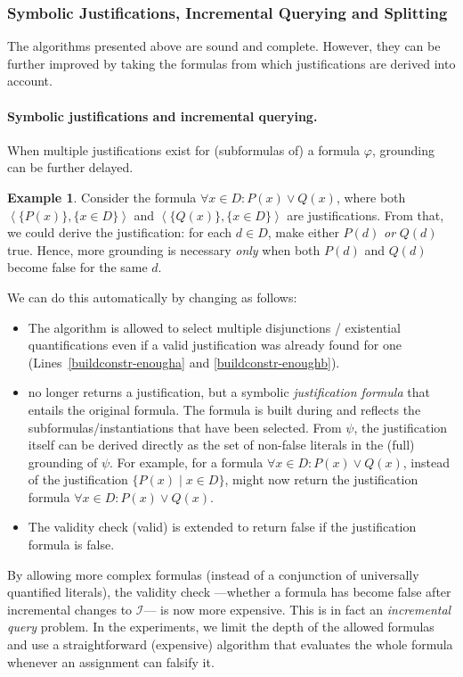 \documentclass[11pt]{article}
\newcommand{\m}[1]{\ensuremath{#1}\xspace}
\newcommand{\I}{\m{\mathcal{I}}}
\newcommand{\f}{\m{\varphi}}
\newcommand{\typed}[2]{\m{#1\in #2:}}
\newcommand{\tuple}[1]{\m{\left \langle #1 \right \rangle }}
\theoremstyle{plain}
\theoremstyle{definition}
\theoremstyle{example_basic}
\newtheorem{example}[thm]{Example}
\theoremstyle{example_contd}
\theoremstyle{plain}
\newcommand{\change}[1]{#1}
\begin{document}
\subsubsection{Symbolic Justifications, Incremental Querying and Splitting}\label{ssec:splitting}
The algorithms presented above are sound and complete. \change{However, they can be further improved by taking the formulas from which
justifications are derived into account.}

\paragraph{Symbolic justifications and incremental querying.}
\change{When multiple justifications exist for (subformulas of) a
  formula \f, grounding can be further delayed.}
\begin{example}
Consider the formula $\forall \typed{x}{D} P(x) \lor Q(x)$, where both
$\tuple{\{P(x)\},\{x\in D\}}$ and $\tuple{\{Q(x)\},\{x\in D\}}$ are
justifications. From that, we could derive the justification: for each
$d \in D$, make either $P(d)$ \emph{or} $Q(d)$ true. Hence, more grounding is necessary
\emph{only} when both $P(d)$ and $Q(d)$ become false for the same $d$.
\end{example}

We can do this automatically by changing \buildconstr as follows: 
\begin{itemize}
  \item The algorithm is allowed to select multiple disjunctions / existential quantifications even if a valid justification was already found for one (Lines~\ref{buildconstr-enougha} and \ref{buildconstr-enoughb}).
  \item \buildconstr no longer returns a justification, but a
    \change{symbolic} \emph{justification formula} that entails the original formula. The formula is built during \buildconstr and reflects the subformulas/instantiations that have been selected. From $\psi$, the justification itself can be derived directly as the set of non-false literals in the (full) grounding of $\psi$.
  For example, for a formula $\forall x \in D: P(x) \lor Q(x)$,
  instead of the justification $\{P(x) \mid x \in D\}$, \buildconstr
  might now return \change{ the justification formula $\forall x \in
    D: P(x) \lor   Q(x)$.}
  \item The validity check (\textsf{valid}) is extended to return false if the justification formula is false.
\end{itemize}
By allowing more complex formulas (instead of a conjunction
of universally quantified literals), \change{the validity check
  ---whether a formula has become false after incremental changes to
  \I--- is now more expensive.  This is in fact an \emph{incremental
    query} problem. In the experiments, we limit the depth of the
  allowed formulas and use a straightforward (expensive) algorithm
  that evaluates the whole formula whenever an assignment can falsify
  it.}
  
\end{document}
